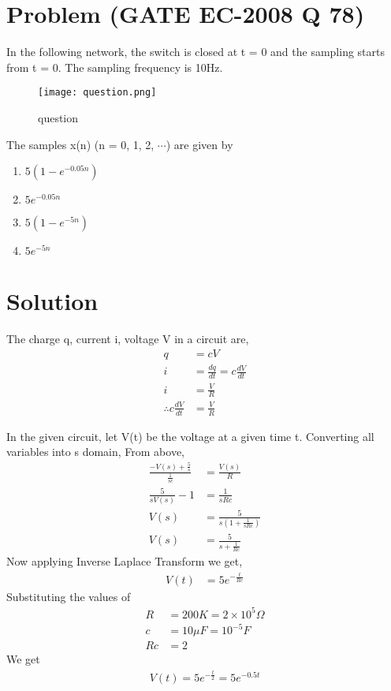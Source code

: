 \documentclass[journal,12pt,twocolumn]{IEEEtran}
\begin{document}
\section*{\textbf{Problem (GATE EC-2008 Q 78)}}
In the following network, the switch is closed at t = 0 and the sampling starts from t = 0. The sampling frequency is 10Hz.

\begin{figure}[!ht]
    \centering
    \texttt{[image: question.png]}
    \caption{question}
    \label{question}
\end{figure}
The samples x(n) (n = 0, 1, 2, $\cdots$) are given by
\begin{enumerate}
   \item $5(1 - e^{-0.05n})$
   \item $5e^{-0.05n}$
   \item $5(1 - e^{-5n})$
   \item $5e^{-5n}$
\end{enumerate}
\section*{\textbf{Solution}}
The charge q, current i, voltage V in a circuit are,
\begin{align}
    q &= cV \\
    i &= \frac{dq}{dt} = c\frac{dV}{dt} \\
    i &= \frac{V}{R} \\
    \therefore c\frac{dV}{dt} &= \frac{V}{R} 
\end{align}

In the given circuit, let V(t) be the voltage at a given time t. Converting all variables into s domain, From above,
\begin{align}
   \frac{-V(s) + \frac{5}{s}}{\frac{1}{sc}} &= \frac{V(s)}{R} \\
   \frac{5}{sV(s)} - 1 &= \frac{1}{sRc} \\
   V(s) &= \frac{5}{s(1 + \frac{1}{sRc})} \\
   V(s) &= \frac{5}{s + \frac{1}{Rc}}
\end{align}
Now applying Inverse Laplace Transform we get,
\begin{align}
    V(t) &= 5e^{-\frac{t}{Rc}}
\end{align}
Substituting the values of
\begin{align}
    R &= 200 K = 2 \times 10^5 \Omega \\
    c &= 10 \mu F = 10^{-5} F \\
    Rc &= 2
\end{align}
We get
\begin{align}
    V(t) = 5e^{-\frac{t}{2}} = 5e^{-0.5t} \label{eq}
\end{align}
\end{document}
